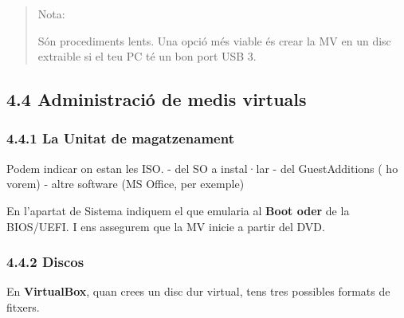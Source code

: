 \documentclass[
  spanish,
  12 pt,
  a4paper,
]{article}
\begin{document}
\begin{quote}
Nota:

Són procediments lents. Una opció més viable és crear la MV en un disc
extraible si el teu PC té un bon port USB 3.
\end{quote}

\subsection{4.4 Administració de medis
virtuals}\label{administraciuxf3-de-medis-virtuals}

\subsubsection{4.4.1 La Unitat de
magatzenament}\label{la-unitat-de-magatzenament}

Podem indicar on estan les ISO. - del SO a instal·lar - del
GuestAdditions ( ho vorem) - altre software (MS Office, per exemple)

En l'apartat de Sistema indiquem el que emularia al \textbf{Boot oder}
de la BIOS/UEFI. I ens assegurem que la MV inicie a partir del DVD.

\subsubsection{4.4.2 Discos}\label{discos}

En \textbf{VirtualBox}, quan crees un disc dur virtual, tens tres
possibles formats de fitxers.
\end{document}
